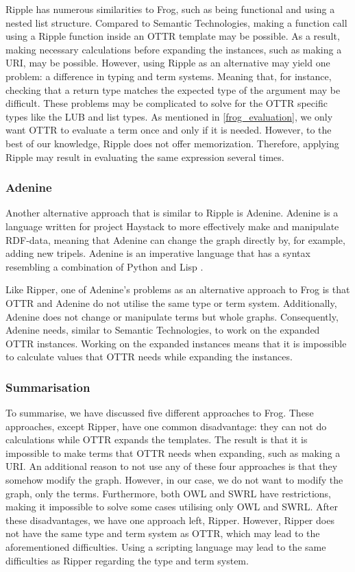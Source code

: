 \para
Ripple has numerous similarities to Frog, such as being functional and using a nested list structure. Compared to Semantic Technologies, making a function call using a Ripple function inside an OTTR template may be possible. As a result, making necessary calculations before expanding the instances, such as making a URI, may be possible. However, using Ripple as an alternative may yield one problem: a difference in typing and term systems. Meaning that, for instance, checking that a return type matches the expected type of the argument may be difficult. These problems may be complicated to solve for the OTTR specific types like the LUB and list types.  As mentioned in \autoref{frog_evaluation}, we only want OTTR to evaluate a term once and only if it is needed. However, to the best of our knowledge, Ripple does not offer memorization. Therefore, applying Ripple may result in evaluating the same expression several times.   

\subsubsection{Adenine}
Another alternative approach that is similar to Ripple is Adenine. Adenine is a language written for project Haystack to more effectively make and manipulate RDF-data, meaning that Adenine can change the graph directly by, for example, adding new tripels. Adenine is an imperative language that has a syntax resembling a combination of Python and Lisp \autocite{Adenine}.

\para
Like Ripper, one of Adenine's problems as an alternative approach to Frog is that OTTR and Adenine do not utilise the same type or term system. Additionally, Adenine does not change or manipulate terms but whole graphs. Consequently, Adenine needs, similar to Semantic Technologies, to work on the expanded OTTR instances. Working on the expanded instances means that it is impossible to calculate values that OTTR needs while expanding the instances. 

\subsubsection{Summarisation}
To summarise, we have discussed five different approaches to Frog. These approaches, except Ripper, have one common disadvantage: they can not do calculations while OTTR expands the templates. The result is that it is impossible to make terms that OTTR needs when expanding, such as making a URI. An additional reason to not use any of these four approaches is that they somehow modify the graph. However, in our case, we do not want to modify the graph, only the terms. Furthermore, both OWL and SWRL have restrictions, making it impossible to solve some cases utilising only OWL and SWRL. After these disadvantages, we have one approach left, Ripper. However, Ripper does not have the same type and term system as OTTR, which may lead to the aforementioned difficulties. Using a scripting language may lead to the same difficulties as Ripper regarding the type and term system. 

